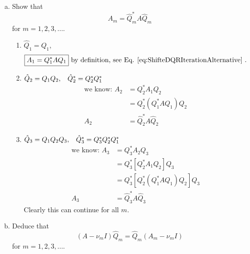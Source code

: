 \documentclass[10pt,letterpaper]{article}
\begin{document}
\begin{enumerate}[(a)]
    \item Show that 
        \begin{equation}
            A_m = \hat{Q}_m^*A\hat{Q}_m
        \end{equation}
        for $m=1,2,3,\ldots$.

        \begin{enumerate}[$m=1$: ]
            \item $\hat{Q}_1 = Q_1$, 
                \begin{equation}
                    \boxed{A_1 = Q_1^*AQ_1} \text{ by definition, see Eq. \ref{eq:ShifteDQRIterationAlternative} }.
                \end{equation}

            \item $\hat{Q}_2 = Q_1Q_2, \hspace{2ex} \hat{Q}_2^* = Q_2^*Q_1^*$
                \begin{subequations}\begin{align}
                    \text{we know: } A_2 &= Q_2^*A_1Q_2 \\
                     &= Q_2^*\left(Q_1^*AQ_1\right)Q_2 \\
                    A_2 &= \hat{Q}_2^*A\hat{Q}_2
                \end{align}\end{subequations}

            \item $\hat{Q}_3 = Q_1Q_2Q_3, \hspace{2ex} \hat{Q}_3^* = Q_3^*Q_2^*Q_1^*$
                \begin{subequations}\begin{align}
                    \text{we know: } A_3 &= Q_3^*A_2Q_3 \\
                     &= Q_3^*\left[Q_2^*A_1Q_2\right]Q_3 \\
                     &= Q_3^*\left[Q_2^*\left(Q_1^*AQ_1\right)Q_2\right]Q_3 \\
                    A_3 &= \hat{Q}_3^*A\hat{Q}_3
                \end{align}\end{subequations}
                Clearly this can continue for all $m$.
        \end{enumerate}

    \item Deduce that 
        \begin{equation}
            \left(A-\nu_mI\right)\hat{Q}_m = \hat{Q}_m\left(A_m - \nu_mI\right)
        \end{equation}
        for $m=1,2,3,\ldots$.


\end{enumerate}
\end{document}
